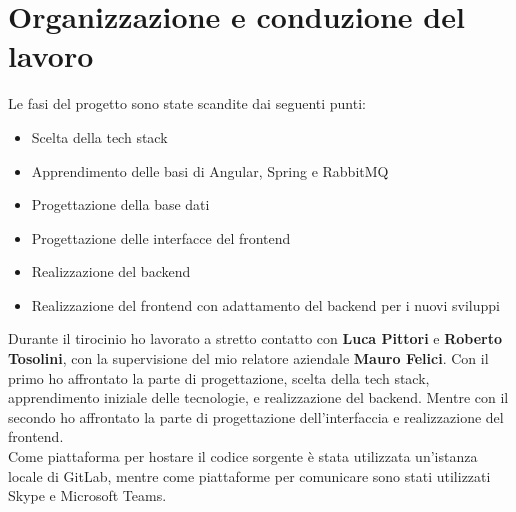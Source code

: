 \section{Organizzazione e conduzione del lavoro}
Le fasi del progetto sono state scandite dai seguenti punti:
\begin{itemize}
  \item Scelta della tech stack
  \item Apprendimento delle basi di Angular, Spring e RabbitMQ
  \item Progettazione della base dati
  \item Progettazione delle interfacce del frontend
  \item Realizzazione del backend
  \item Realizzazione del frontend con adattamento del backend per i nuovi sviluppi
\end{itemize}
Durante il tirocinio ho lavorato a stretto contatto con \textbf{Luca Pittori} e \textbf{Roberto Tosolini}, con la supervisione del mio relatore aziendale \textbf{Mauro Felici}.
Con il primo ho affrontato la parte di progettazione, scelta della tech stack, apprendimento iniziale delle tecnologie, e realizzazione del backend. Mentre con il secondo
ho affrontato la parte di progettazione dell'interfaccia e realizzazione del frontend.
\\
Come piattaforma per hostare il codice sorgente \`e stata utilizzata un'istanza locale di GitLab, mentre come piattaforme per comunicare sono stati utilizzati Skype e Microsoft Teams.
